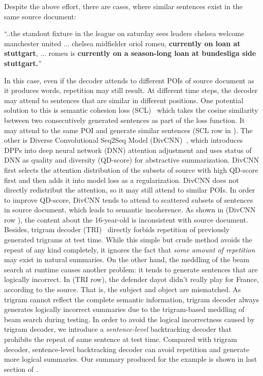 Despite the above effort, there are cases, where similar sentences 
exist in the same source document:
\begin{example}
\label{ex:repeatsrc}
\small{``..the standout fixture in the league on saturday sees leaders 
	   chelsea welcome manchester united ... chelsea midfielder oriol romeu, 
\textbf{currently on loan at stuttgart}, ... romeu is 
\textbf{currently on a season-long loan at bundesliga side stuttgart.}''} 
\end{example}

In this case, even if the decoder attends to different POIs of 
source document as it produces words, repetition may still result.  
At different time steps, 
the decoder may attend 
to sentences that are similar in different positions.
One potential solution to this is semantic cohesion loss (SCL)~\citep{elikyilmazBHC18}
which takes the cosine similarity between two consecutively generated sentences
as part of the loss function. It may attend to the same POI
and generate similar sentences (SCL row in ).  
The other is Diverse Convolutional Seq2Seq
Model (DivCNN)~\citep{DivC2C19}, 
which introduces DPPs into deep neural network (DNN) attention adjustment
and uses status of DNN as quality and diversity (QD-score) for abstractive summarization.
DivCNN first selects the attention distribution of the subsets of source with high QD-score
first and then adds it into model loss as a regularization.
DivCNN does not directly redistribut the attention,
so it may still attend to similar POIs.
In order to improve QD-score, DivCNN tends to attend to scattered subsets of sentences in source document,
which leads to semantic incoherence. 
As shown in  (DivCNN row ),
the content about the 16-year-old 
is inconsistent with source document.
Besides, trigram decoder (TRI)~\citep{PaulusXS17} 
directly forbids repetition of previously generated trigrams at test time. 
While this simple but crude method avoids the repeat of any kind
completely, 
it ignores the fact that \textit{some amount of repetition} may exist
in natural summaries.  
On the other hand, the meddling of the beam search at runtime causes another problem: 
it tends to generate sentences that are logically incorrect. 
In  (TRI row), the defender dayot didn't
really play for France, according to the source.
That is, the subject and object are mismatched.
As trigram cannot reflect the complete semantic information, 
trigram decoder always generates logically incorrect summaries 
due to the trigram-based meddling of beam search 
during testing. 
In order to avoid the logical incorrectness caused by trigram decoder,
we introduce  a {\em sentence-level} backtracking decoder
that prohibits the repeat of same sentence at test time. 
Compared with trigram decoder, 
sentence-level backtracking decoder can avoid repetition and generate more logical summaries. 
Our summary produced for the example is shown in last section of 
.

